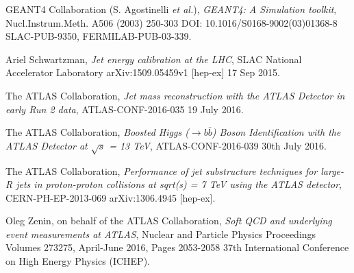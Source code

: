 \documentclass[UKenglish,texlive=2013]{\ATLASLATEXPATH atlasdoc}
\newcommand{\cme}{\sqrt{s}}
\begin{document}
\begin{thebibliography}{9}
GEANT4 Collaboration (S. Agostinelli \emph{et al.}), 
\emph{GEANT4: A Simulation toolkit},
Nucl.Instrum.Meth. A506 (2003) 250-303
DOI: 10.1016/S0168-9002(03)01368-8
SLAC-PUB-9350, FERMILAB-PUB-03-339.

Ariel Schwartzman,
\emph{Jet energy calibration at the LHC},
SLAC National Accelerator Laboratory
arXiv:1509.05459v1 [hep-ex] 17 Sep 2015.

The ATLAS Collaboration,
\emph{Jet mass reconstruction with the ATLAS Detector in early Run 2 data},
ATLAS-CONF-2016-035
19 July 2016.

The ATLAS Collaboration,
\emph{Boosted Higgs ($\to b\bar{b}$) Boson Identification with the ATLAS
Detector at $\cme$ = 13 TeV},
ATLAS-CONF-2016-039
30th July 2016.






The ATLAS Collaboration,
\emph{Performance of jet substructure techniques for large-R jets in proton-proton collisions at sqrt(s) = 7 TeV using the ATLAS detector},
CERN-PH-EP-2013-069
arXiv:1306.4945 [hep-ex].

Oleg Zenin, on behalf of the ATLAS Collaboration,
\emph{Soft QCD and underlying event measurements at ATLAS},
Nuclear and Particle Physics Proceedings
Volumes 273275, April-June 2016, Pages 2053-2058
37th International Conference on High Energy Physics (ICHEP).


\end{thebibliography}
\end{document}
